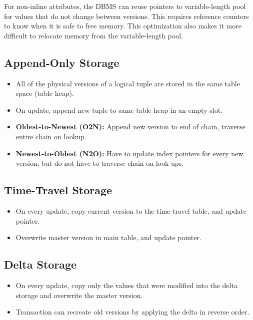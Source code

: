 \documentclass[11pt]{article}
\begin{document}
For non-inline attributes, the DBMS can reuse pointers to variable-length pool for values that do 
not change between versions. This requires reference counters to know when it is safe to free 
memory. This optimization also makes it more difficult to relocate memory from the variable-length 
pool.
    
\subsection*{Append-Only Storage}
    \begin{itemize}
        \item
        All of the physical versions of a logical tuple are stored in the same table space 
        (table heap).
        
        \item
        On update, append new tuple to same table heap in an empty slot.
        
        \item \textbf{Oldest-to-Newest (O2N):}
        Append new version to end of chain, traverse entire chain on lookup.
        
        \item \textbf{Newest-to-Oldest (N2O):}
        Have to update index pointers for every new version, but do not have to traverse chain on 
        look ups.
\end{itemize}

\subsection*{Time-Travel Storage}
\begin{itemize}
    \item
    On every update, copy current version to the time-travel table, and update pointer.
    
    \item
    Overwrite master version in main table, and update pointer.
\end{itemize}

\subsection*{Delta Storage}
\begin{itemize}
    \item
    On every update, copy only the values that were modified into the delta storage and 
    overwrite the master version.
    
    \item
    Transaction can recreate old versions by applying the delta in reverse order.
\end{itemize}
\end{document}
